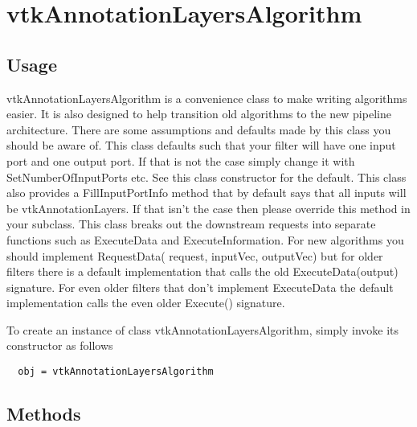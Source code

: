 \section{vtkAnnotationLayersAlgorithm}

\subsection{Usage}

 vtkAnnotationLayersAlgorithm is a convenience class to make writing algorithms
 easier. It is also designed to help transition old algorithms to the new
 pipeline architecture. There are some assumptions and defaults made by this
 class you should be aware of. This class defaults such that your filter
 will have one input port and one output port. If that is not the case
 simply change it with SetNumberOfInputPorts etc. See this class
 constructor for the default. This class also provides a FillInputPortInfo
 method that by default says that all inputs will be vtkAnnotationLayers. If that
 isn't the case then please override this method in your subclass. This
 class breaks out the downstream requests into separate functions such as
 ExecuteData and ExecuteInformation.  For new algorithms you should
 implement RequestData( request, inputVec, outputVec) but for older filters
 there is a default implementation that calls the old ExecuteData(output)
 signature. For even older filters that don't implement ExecuteData the
 default implementation calls the even older Execute() signature.

To create an instance of class vtkAnnotationLayersAlgorithm, simply
invoke its constructor as follows
\begin{verbatim}
  obj = vtkAnnotationLayersAlgorithm
\end{verbatim}
\subsection{Methods}

